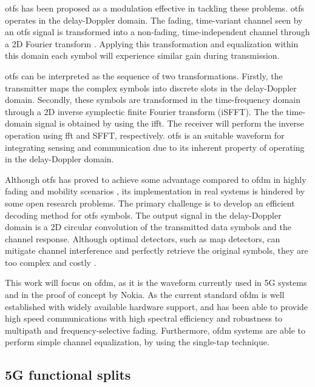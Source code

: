 	\Gls{otfs} has been proposed as a modulation effective in tackling these problems. \Gls{otfs} operates in the delay-Doppler domain. 
	The fading, time-variant channel seen by an \gls{otfs} signal is transformed into a non-fading, time-independent channel through a 2D Fourier transform \cite{OTFS_Hadani_2017}. 
	Applying this transformation and equalization within this domain each symbol will experience similar gain during transmission.
	
	\gls{otfs} can be interpreted as the sequence of two transformations. 
	Firstly, the transmitter maps the complex symbols into discrete slots in the delay-Doppler domain.
	Secondly, these symbols are transformed in the time-frequency domain through a 2D inverse symplectic finite Fourier transform (iSFFT). The the time-domain signal is obtained by using the \gls{ifft}. 
	The receiver will perform the inverse operation using \gls{fft} and SFFT, respectively.
	\gls{otfs} is an suitable waveform for integrating sensing and communication due to its inherent property of operating in the delay-Doppler domain.
	
	Although \gls{otfs} has proved to achieve some advantage compared to \gls{ofdm} in highly fading and mobility scenarios \cite{OTFS_Hadani_2017}, its implementation in real systems is hindered by some open research problems. 
	The primary challenge is to develop an efficient decoding method for \gls{otfs} symbols.
	The output signal in the delay-Doppler domain is a 2D circular convolution of the transmitted data symbols and the channel response. Although optimal detectors, such as \gls{map} detectors, can mitigate channel interference and perfectly retrieve the original symbols, they are too complex and costly \cite{Raviteja_Viterbo_OTFS_decoding}.
	
	This work will focus on \gls{ofdm}, as it is the waveform currently used in 5G systems and in the proof of concept by Nokia. 
	As the current standard \gls{ofdm} is well established with widely available hardware support, and has been able to provide high speed communications with high spectral efficiency and robustness to multipath and frequency-selective fading.
	Furthermore, \gls{ofdm} systems are able to perform simple channel equalization, by using the single-tap technique.
	
	 
	
	\subsection{5G functional splits}
	
